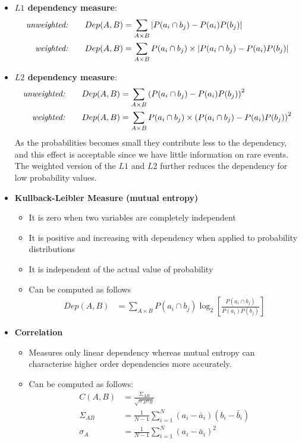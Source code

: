 \documentclass[12pt,twoside]{article}
\begin{document}
\begin{enumerate}
\begin{itemize}
\item \textbf{$L1$ dependency measure}:
\begin{align*}
    \text{\textit{unweighted:}} \qquad Dep (A,B) & = \sum_{A\times B} \left\vert P(a_i \cap b_j) - P(a_i)P(b_j)\right\vert \\
    \text{\textit{weighted:}} \qquad Dep (A,B) & = \sum_{A\times B} P(a_i \cap b_j) \times \left\vert P(a_i \cap b_j) - P(a_i)P(b_j)\right\vert 
\end{align*}
\item \textbf{$L2$ dependency measure}:
\begin{align*}
\text{\textit{unweighted:}} \qquad Dep (A,B) & = \sum_{A\times B} \left(P(a_i \cap b_j) - P(a_i)P(b_j)\right)^2\\
\text{\textit{weighted:}} \qquad Dep (A,B) & = \sum_{A\times B} P(a_i \cap b_j) \times \left(P(a_i \cap b_j) - P(a_i)P(b_j)\right)^2
\end{align*}
As the probabilities becomes small they contribute less to the dependency, and this effect is acceptable since we have little information on rare events. 
The weighted version of the $L1$ and $L2$ further reduces the dependency for low probability values.

\item \textbf{Kullback-Leibler Measure (mutual entropy)}
\begin{itemize}
\item It is zero when two variables are completely independent
\item It is positive and increasing with dependency when applied to probability distributions
\item It is independent of the actual value of probability
\item Can be computed as follows
\begin{align*}
Dep(A,B)& = \sum_{A\times B} P(a_i \cap b_j) \log_2\left[\frac{P(a_i \cap b_j)}{P(a_i)P(b_j)}\right]
\end{align*}

\end{itemize}

\item \textbf{Correlation}
\begin{itemize}
\item Measures only linear dependency whereas mutual entropy can characterise higher order dependencies more accurately.
\item Can be computed as follows:
\begin{align*}
C(A,B) & = \frac{\Sigma_{AB}}{\sqrt{\sigma_A\sigma_B}}\\
\Sigma_{AB}& = \frac{1}{N-1}\sum_{i=1}^N (a_i -\bar{a}_i)(b_i -\bar{b}_i)\\
\sigma_A& = \frac{1}{N-1}\sum_{i=1}^N (a_i -\bar{a}_i)^2
\end{align*}
\end{itemize}
\end{itemize}

\end{enumerate}
\end{document}
